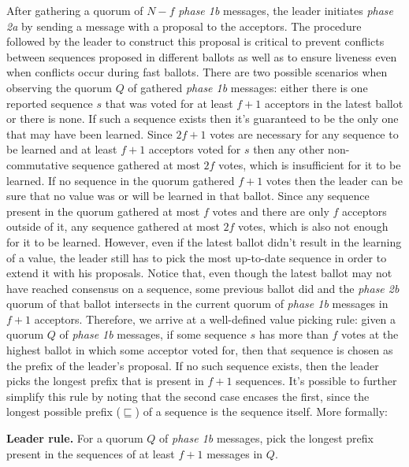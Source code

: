 After gathering a quorum of $N-f$ \textit{phase 1b} messages, the leader initiates \textit{phase 2a} by sending a message with a proposal to the acceptors. The procedure followed by the leader to construct this proposal is critical to prevent conflicts between sequences proposed in different ballots as well as to ensure liveness even when conflicts occur during fast ballots. There are two possible scenarios when observing the quorum $Q$ of gathered \textit{phase 1b} messages: either there is one reported sequence $s$ that was voted for at least $f+1$ acceptors in the latest ballot or there is none. If such a sequence exists then it's guaranteed to be the only one that may have been learned. Since $2f+1$ votes are necessary for any sequence to be learned and at least $f+1$ acceptors voted for $s$ then any other non-commutative sequence gathered at most $2f$ votes, which is insufficient for it to be learned. If no sequence in the quorum gathered $f+1$ votes then the leader can be sure that no value was or will be learned in that ballot. Since any sequence present in the quorum gathered at most $f$ votes and there are only $f$ acceptors outside of it, any sequence gathered at most $2f$ votes, which is also not enough for it to be learned. However, even if the latest ballot didn't result in the learning of a value, the leader still has to pick the most up-to-date sequence in order to extend it with his proposals. Notice that, even though the latest ballot may not have reached consensus on a sequence, some previous ballot did and the \textit{phase 2b} quorum of that ballot intersects in the current quorum of \textit{phase 1b} messages in $f+1$ acceptors. Therefore, we arrive at a well-defined value picking rule: given a quorum $Q$ of \textit{phase 1b} messages, if some sequence $s$ has more than $f$ votes at the highest ballot in which some acceptor voted for, then that sequence is chosen as the prefix of the leader's proposal. If no such sequence exists, then the leader picks the longest prefix that is present in $f+1$ sequences. It's possible to further simplify this rule by noting that the second case encases the first, since the longest possible prefix ($\sqsubseteq$) of a sequence is the sequence itself. More formally:

\begin{displayquote}
\textbf{Leader rule.} For a quorum $Q$ of \textit{phase 1b} messages, pick the longest prefix present in the sequences of at least $f+1$ messages in $Q$.
\end{displayquote}

